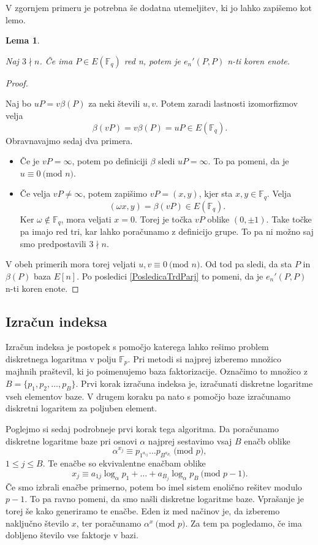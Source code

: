 \documentclass[12pt,a4paper,twoside]{article}
\theoremstyle{definition} %
\theoremstyle{plain} %
\newtheorem{lema}[definicija]{Lema}
\numberwithin{equation}{section}  %
\newcommand{\F}{\mathbb F}
\newcommand{\E}[1]{E({#1})}
\newcommand{\MOD}[1]{\ \text{(mod }{#1}\text{)}}
\begin{document}
V zgornjem primeru je potrebna še dodatna utemeljitev, ki jo lahko zapišemo kot lemo.

\begin{lema}~

\label{lema:6.1}
Naj $3 \nmid n$. Če ima $P \in \E{\F_q}$ red n, potem je $e_n'(P,P)$ n-ti koren enote.
\end{lema}

\begin{proof}~

Naj bo $uP = v\beta(P)$ za neki števili $u,v$. Potem zaradi lastnosti izomorfizmov velja
$$\beta(vP) = v\beta(P) = uP \in \E{\F_q}.$$
Obravnavajmo sedaj dva primera.
\begin{itemize}
\item Če je $vP = \infty$, potem po definiciji $\beta$ sledi $uP = \infty$. To pa pomeni, da je $u \equiv 0 \MOD{n}$.
\item Če velja $vP \neq \infty$, potem zapišimo $vP = (x,y)$, kjer sta $x,y \in \F_q$. Velja
$$(\omega x,y) = \beta(vP) \in \E{\F_q}.$$
Ker $\omega \notin \F_q$, mora veljati $x = 0$. Torej je točka $vP$ oblike $(0,\pm 1)$. Take točke pa imajo red tri, kar lahko poračunamo z definicijo grupe. To pa ni možno saj smo predpostavili $3 \nmid n$.
\end{itemize}

V obeh primerih mora torej veljati $u,v \equiv 0 \MOD{n}$. Od tod pa sledi, da sta $P$ in $\beta(P)$ baza $E[n]$. Po posledici \ref{PosledicaTrdParj} to pomeni, da je $e_n'(P,P)$ n-ti koren enote.

\end{proof}



\subsection{Izračun indeksa}
\label{IndexCalc}

Izračun indeksa je postopek s pomočjo katerega lahko rešimo problem diskretnega logaritma v polju $\F_p$.
Pri metodi si najprej izberemo množico majhnih praštevil, ki jo poimenujemo baza faktorizacije. Označimo to množico z $B = \{ p_1,p_2, \ldots, p_B \}$. Prvi korak izračuna indeksa je, izračunati diskretne logaritme vseh elementov baze. V drugem koraku pa nato s pomočjo baze izračunamo diskretni logaritem za poljuben element.

Poglejmo si sedaj podrobneje prvi korak tega algoritma. Da poračunamo diskretne logaritme baze pri osnovi $\alpha$ najprej sestavimo vsaj $B$ enačb oblike
$$\alpha^{x_j} \equiv p_{1^{a_{1j}}}\ldots p_{B^{a_{B_j}}} \MOD{p},$$
$1\leq j \leq B.$
Te enačbe so ekvivalentne enačbam oblike
$$x_j \equiv a_{1j}\log_{\alpha}p_1 + \ldots + a_{B_j}\log_{\alpha}p_B \MOD{p-1}.$$
Če smo izbrali enačbe primerno, potem bo imel sistem enolično rešitev modulo $p-1$. To pa ravno pomeni, da smo našli diskretne logaritme baze. Vprašanje je torej še kako generiramo te enačbe. Eden iz med načinov je, da izberemo naključno število $x$, ter poračunamo $\alpha^x \MOD{p}$. Za tem pa pogledamo, če ima dobljeno število vse faktorje v bazi.
\end{document}

